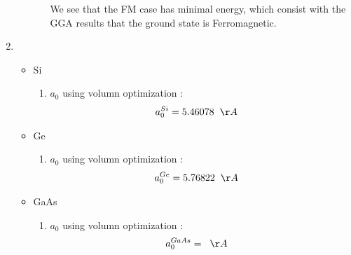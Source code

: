 \documentclass[notitlepage]{revtex4-1}
\begin{document}
\begin{CJK}{UTF8}{bsmi}
\begin{enumerate}
\begin{itemize}
\begin{enumerate}[label=(\arabic*)]
					We see that the FM case has minimal energy, which consist with the GGA results that the ground state is Ferromagnetic. 
					 
					
				\end{enumerate}
		\end{itemize}
	\item
	\begin{itemize}
		\item Si
		\begin{enumerate}[label=(\arabic*)]
			\item $a_0$ using volumn optimization :
			\begin{align*}
			a^{Si}_0 &= 5.46078 \hspace{0.2cm} \AA 
			\end{align*} 
		\end{enumerate}
	
		\item Ge
		\begin{enumerate}[label=(\arabic*)]
			\item $a_0$ using volumn optimization :
			\begin{align*}
			a^{Ge}_0 &= 5.76822 \hspace{0.2cm} \AA 
			\end{align*} 
		\end{enumerate}
	
		\item GaAs
		\begin{enumerate}[label=(\arabic*)]
			\item $a_0$ using volumn optimization :
			\begin{align*}
			a^{GaAs}_0 &=  \hspace{0.2cm} \AA 
			\end{align*} 
		\end{enumerate}		
	\end{itemize}
\end{enumerate}






	
\end{CJK}
\end{document}
